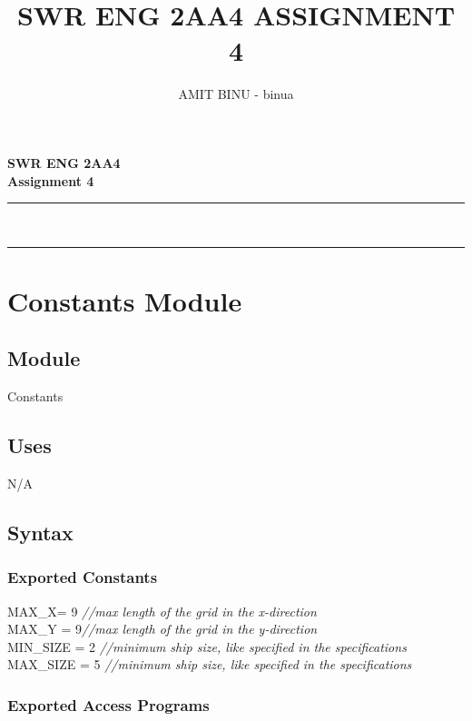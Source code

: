 \documentclass[12pt]{article}
\title{SWR ENG 2AA4 ASSIGNMENT 4}
\author{AMIT BINU - binua}
\begin{document}
\makeatletter
\vspace*{8em}
\noindent
\hfil\parbox[t]{1\textwidth}{\centering\Huge\bfseries{SWR ENG 2AA4}\\[0.5ex]{Assignment 4}}\par
\kern0.6cm \hrule\kern0.4cm
\noindent
\hfil\parbox[t]{1\textwidth}{\centering\large\bfseries\@author\\[2ex]\@date}\par
\kern0.3cm \hrule\kern0cm
\makeatother
\newpage
%
\newpage

\section* {Constants Module}

\subsection*{Module}

Constants

\subsection* {Uses}

N/A

\subsection* {Syntax}

\subsubsection* {Exported Constants}

MAX\_X= 9 {\it //max length of the grid in the x-direction}\\
MAX\_Y = 9{\it //max length of the grid in the y-direction}\\
MIN\_SIZE = 2 {\it //minimum ship size, like specified in the specifications}\\
MAX\_SIZE = 5 {\it //minimum ship size, like specified in the specifications}


\subsubsection* {Exported Access Programs}
\end{document}
